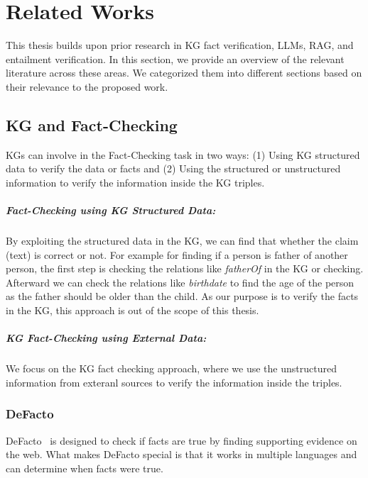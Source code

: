 \chapter{Related Works}\label{ch:related_works}
This thesis builds upon prior research in \ac{KG} fact verification, \ac{LLMs}, \ac{RAG}, and entailment verification.
In this section, we provide an overview of the relevant literature across these areas.
We categorized them into different sections based on their relevance to the proposed work.

\section{\ac{KG} and Fact-Checking}\label{sec:knowledge-graph-fact-verification}
\acp{KG} can involve in the Fact-Checking task in two ways:
(1) Using KG structured data to verify the data or facts
and (2) Using the structured or unstructured information to verify the information inside the KG triples.
\paragraph{Fact-Checking using KG Structured Data:}
By exploiting the structured data in the KG, we can find that whether the claim (\ie text) is correct or not.
For example for finding if a person is father of another person, the first step is checking the relations like \textit{fatherOf} in the KG or checking.
Afterward we can check the relations like \textit{birthdate} to find the age of the person as the father should be older than the child.
As our purpose is to verify the facts in the KG, this approach is out of the scope of this thesis.

\paragraph{KG Fact-Checking using External Data:}
We focus on the KG fact checking approach, where we use the unstructured information from exteranl sources to verify the information inside the triples.

\subsection{DeFacto}\label{subsec:defacto}
DeFacto~\cite{GERBER201585} is designed to check if facts are true by finding supporting evidence on the web.
What makes DeFacto special is that it works in multiple languages and can determine when facts were true.

